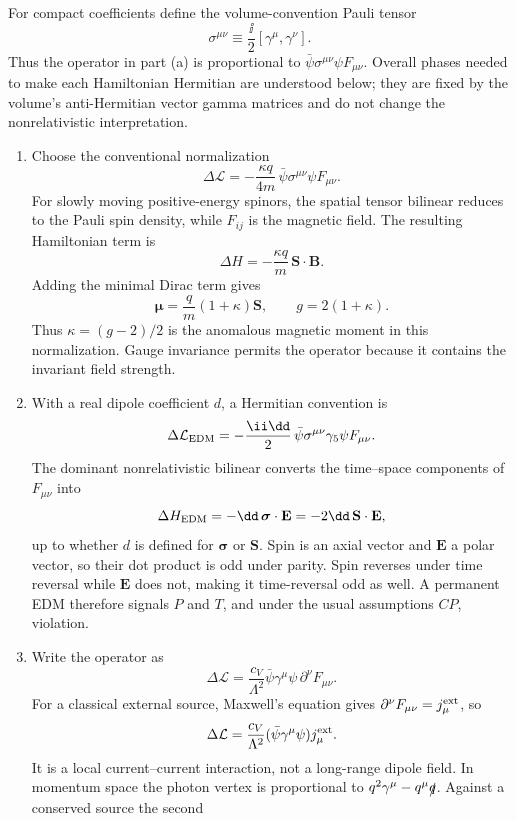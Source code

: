 \begin{enumerate}
For compact coefficients define the volume-convention Pauli tensor
\[
 \sigma^{\mu\nu}\equiv\frac{\ii}{2}[\gamma^\mu,\gamma^\nu].
\]
Thus the operator in part (a) is proportional to
\(\bar\psi\sigma^{\mu\nu}\psi F_{\mu\nu}\).  Overall phases needed to make
each Hamiltonian Hermitian are understood below; they are fixed by the
volume's anti-Hermitian vector gamma matrices and do not change the
nonrelativistic interpretation.
\begin{enumerate}
\item
Choose the conventional normalization
\[
 \Delta\mathcal L
 =-\frac{\kappa q}{4m}\,
 \bar\psi\sigma^{\mu\nu}\psi F_{\mu\nu}.
\]
For slowly moving positive-energy spinors, the spatial tensor bilinear
reduces to the Pauli spin density, while
\(F_{ij}\) is the magnetic field.  The resulting Hamiltonian term is
\[
 \Delta H=-\frac{\kappa q}{m}\,
 \mathbf S\cdot\mathbf B.
\]
Adding the minimal Dirac term gives
\[
 \boldsymbol\mu=\frac{q}{m}(1+\kappa)\mathbf S,
\qquad
 g=2(1+\kappa).
\]
Thus \(\kappa=(g-2)/2\) is the anomalous magnetic moment in this
normalization.  Gauge invariance permits the operator because it contains
the invariant field strength.
\item
With a real dipole coefficient \(d\), a Hermitian convention is
\[
 \Delta\mathcal L_{\rm EDM}
 =-\frac{\ii \dd}{2}\,
 \bar\psi\sigma^{\mu\nu}\gamma_5\psi F_{\mu\nu}.
\]
The dominant nonrelativistic bilinear converts the time--space components
of \(F_{\mu\nu}\) into
\[
 \Delta H_{\rm EDM}=-\dd\,\boldsymbol\sigma\cdot\mathbf E
 =-2\dd\,\mathbf S\cdot\mathbf E,
\]
up to whether \(d\) is defined for \(\boldsymbol\sigma\) or \(\mathbf S\).
Spin is an axial vector and \(\mathbf E\) a polar vector, so their dot
product is odd under parity.  Spin reverses under time reversal while
\(\mathbf E\) does not, making it time-reversal odd as well.  A permanent
EDM therefore signals \(P\) and \(T\), and under the usual assumptions
\(CP\), violation.
\item
Write the operator as
\[
 \Delta\mathcal L
 =\frac{c_V}{\Lambda^2}
 \bar\psi\gamma^\mu\psi\,\partial^\nu F_{\mu\nu}.
\]
For a classical external source, Maxwell's equation gives
\(\partial^\nu F_{\mu\nu}=j^{\rm ext}_\mu\), so
\[
 \Delta\mathcal L
 =\frac{c_V}{\Lambda^2}
 (\bar\psi\gamma^\mu\psi)j^{\rm ext}_\mu .
\]
It is a local current--current interaction, not a long-range dipole field.
In momentum space the photon vertex is proportional to
\(q^2\gamma^\mu-q^\mu\slashed q\).  Against a conserved source the second

\end{enumerate}
\end{enumerate}
